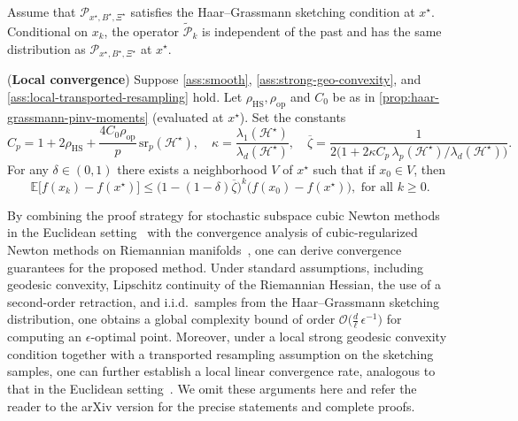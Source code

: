 \documentclass[final,onefignum,onetabnum]{siamart250211}
\begin{document}
\begin{assumption}
  \label{ass:local-transported-resampling}
  Assume that $\mathcal P_{x^\star,B^\star,\Xi^\star}$ satisfies the Haar--Grassmann sketching condition at $x^\star$.
  Conditional on $x_k$, the operator $\widetilde{\mathcal P}_k$ is independent of the past and has the same distribution as 
  $
  \mathcal P_{x^\star,B^\star,\Xi^\star}
  $ at $x^\star$.
  \end{assumption}

  \begin{theorem}
    \label{thm:explicit-rate-nystrom}
    (\textbf{Local convergence})
    Suppose \cref{ass:smooth}, \cref{ass:strong-geo-convexity}, and \cref{ass:local-transported-resampling} hold. Let $\rho_{\mathrm{HS}},\rho_{\mathrm{op}}$ and $C_0$ be as in \cref{prop:haar-grassmann-pinv-moments} (evaluated at $x^\star$). Set the constants
    \[
    C_p=1+2\rho_{\mathrm{HS}}+\frac{4C_0\rho_{\mathrm{op}}}{p}\,\mathrm{sr}_p(\mathcal{H}^\star),
    \quad
    \kappa=\frac{\lambda_1(\mathcal{H}^\star)}{\lambda_d(\mathcal{H}^\star)},
    \quad
    \overline{\zeta}=\frac{1}{2\bigl(1+2\kappa C_p\,\lambda_p(\mathcal{H}^\star)/\lambda_d(\mathcal{H}^\star)\bigr)}.
    \]
    For any $\delta\in(0,1)$ there exists a neighborhood $V$ of $x^\star$ such that if $x_0\in V$, then
    \[
    \mathbb E\bigl[f(x_k)-f(x^\star)\bigr]\le\bigl(1-(1-\delta)\overline{\zeta}\bigr)^k\bigl(f(x_0)-f(x^\star)\bigr), \text{ for all }k\ge 0.
    \]
  \end{theorem}

  \else
  By combining the proof strategy for stochastic subspace cubic Newton methods in the Euclidean setting~\cite{hanzely2020stochastic} with the convergence analysis of cubic-regularized Newton methods on Riemannian manifolds~\cite{zhang2018cubic}, one can derive convergence guarantees for the proposed method. Under standard assumptions, including geodesic convexity, Lipschitz continuity of the Riemannian Hessian, the use of a second-order retraction, and i.i.d.\ samples from the Haar--Grassmann sketching distribution, one obtains a global complexity bound of order $\mathcal O\!\bigl(\tfrac{d}{\ell}\,\epsilon^{-1}\bigr)$ for computing an $\epsilon$-optimal point. 
  Moreover, under a local strong geodesic convexity condition together with a transported resampling assumption on the sketching samples, one can further establish a local linear convergence rate, analogous to that in the Euclidean setting~\cite{hanzely2020stochastic}. We omit these arguments here and refer the reader to the arXiv version for the precise statements and complete proofs.
  \fi
\end{document}
